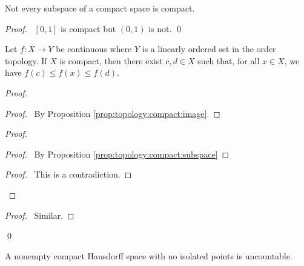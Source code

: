 \begin{cor}
Not every subspace of a compact space is compact.
\end{cor}

\begin{proof}
\pf\ $[0,1]$ is compact but $(0,1)$ is not. \qed
\end{proof}

\begin{thm}
  Let $f : X \rightarrow Y$ be continuous where $Y$ is a linearly ordered set
  in the order topology. If $X$ is compact, then there exist $c, d \in X$
  such
  that, for all $x \in X$, we have $f(c) \leq f(x) \leq f(d)$.
\end{thm}

\begin{proof}
  \pf
  \begin{proof}
    \pf\ By Proposition \ref{prop:topology:compact:image}.
  \end{proof}
  \begin{proof}
    \begin{proof}
      \pf\ By Proposition \ref{prop:topology:compact:subspace}
    \end{proof}
    \qedstep
    \begin{proof}
      \pf\ This is a contradiction.
    \end{proof}
  \end{proof}
  \begin{proof}
    \pf\ Similar.
  \end{proof}
  \qed
\end{proof}

\begin{thm}[DC]
  A nonempty compact Hausdorff space with no isolated points is uncountable.
\end{thm}

